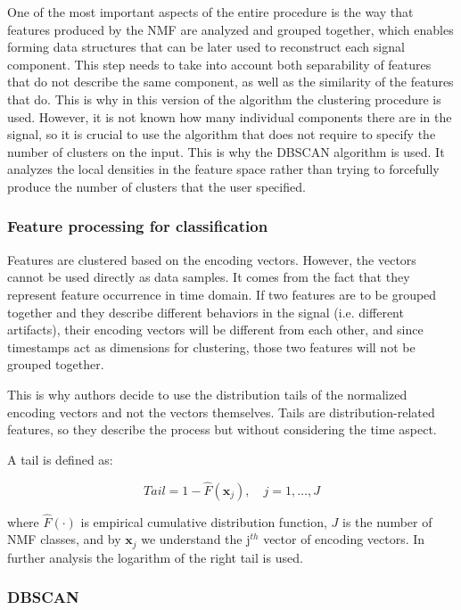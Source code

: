 \documentclass[3p,times]{elsarticle}
\begin{document}
One of the most important aspects of the entire procedure is the way that features produced by the NMF are analyzed and grouped together, which enables forming data structures that can be later used to reconstruct each signal component. This step needs to take into account both separability of features that do not describe the same component, as well as the similarity of the features that do. This is why in this version of the algorithm the clustering procedure is used. However, it is not known how many individual components there are in the signal, so it is crucial to use the algorithm that does not require to specify the number of clusters on the input. This is why the DBSCAN algorithm is used. It analyzes the local densities in the feature space rather than trying to forcefully produce the number of clusters that the user specified. 

\subsubsection{Feature processing for classification}\label{s:ogony}

Features are clustered based on the encoding vectors. However, the vectors cannot be used directly as data samples. It comes from the fact that they represent feature occurrence in time domain. If two features are to be grouped together and they describe different behaviors in the signal (i.e. different artifacts), their encoding vectors will be different from each other, and since timestamps act as dimensions for clustering, those two features will not be grouped together. 

This is why authors decide to use the distribution tails of the normalized encoding vectors and not the vectors themselves. Tails are distribution-related features, so they describe the process but without considering the time aspect. 

A tail is defined as: 

\begin{equation}
  \label{eq:tails} 
  Tail=1-\hat{F}(\textbf{x}_j), \quad j=1,\dots,J
\end{equation}

where $\hat{F}(\cdot)$ is empirical cumulative distribution function, $J$ is the number of NMF classes, and by $\textbf{x}_j$ we understand the j$^{th}$ vector of encoding vectors. In further analysis the logarithm of the right tail is used.


\subsubsection{DBSCAN}\label{s:dbscan}
\end{document}
